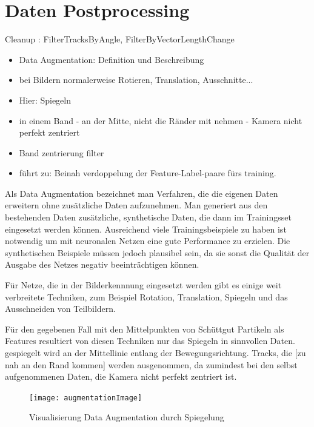 


\section{Daten Postprocessing}

Cleanup : FilterTracksByAngle, FilterByVectorLengthChange 

\color{blue}
\begin{itemize}
	\item Data Augmentation: Definition und Beschreibung
	\item bei Bildern normalerweise Rotieren, Translation, Ausschnitte...
	\item Hier: Spiegeln
	\item in einem Band - an der Mitte, nicht die Ränder mit nehmen - Kamera nicht perfekt zentriert
	\item Band zentrierung filter
	\item führt zu: Beinah verdoppelung der Feature-Label-paare fürs training.
\end{itemize}
\color{black}

Als Data Augmentation bezeichnet man Verfahren, die die eigenen Daten erweitern ohne zusätzliche Daten aufzunehmen.
Man generiert aus den bestehenden Daten zusätzliche, synthetische Daten, die dann im Trainingsset eingesetzt werden können.
Ausreichend viele Trainingsbeispiele zu haben ist notwendig um mit neuronalen Netzen eine gute Performance zu erzielen.
Die synthetischen Beispiele müssen jedoch plausibel sein, da sie sonst die Qualität der Ausgabe des Netzes negativ beeinträchtigen können.

Für Netze, die in der Bilderkennnung eingesetzt werden gibt es einige weit verbreitete Techniken,
zum Beispiel Rotation, Translation, Spiegeln und das Ausschneiden von Teilbildern.

Für den gegebenen Fall mit den Mittelpunkten von Schüttgut Partikeln als Features resultiert von diesen Techniken nur das Spiegeln in sinnvollen Daten.
gespiegelt wird an der Mittellinie entlang der Bewegungsrichtung.
Tracks, die [zu nah an den Rand kommen] werden ausgenommen, da zumindest bei den selbst aufgenommenen Daten, die Kamera nicht perfekt zentriert ist.

\begin{figure}
	\centering
	\texttt{[image: augmentationImage]}
	\caption{Visualisierung Data Augmentation durch Spiegelung}
	\label{fig:dataAugm}
\end{figure}



